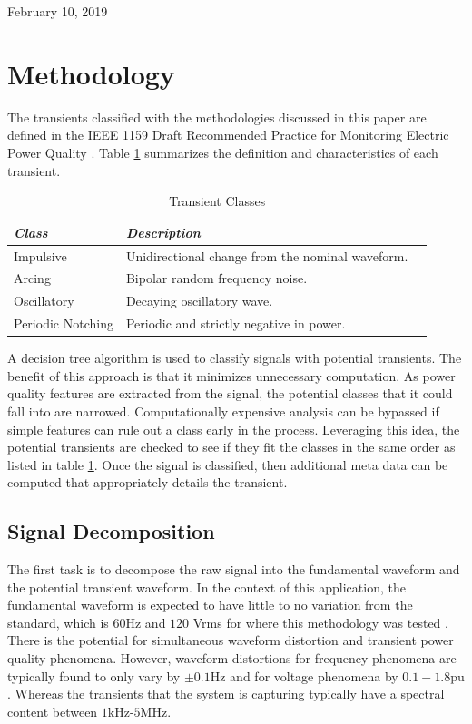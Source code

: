 \documentclass[10pt, conference, compsocconf]{IEEEtran}
\begin{document}
\hfill February 10, 2019

\section{Methodology}
\label{sec:Methodology}
The transients classified with the methodologies discussed in this paper are  defined in the IEEE 1159 Draft Recommended Practice for Monitoring Electric Power Quality \cite{IEEE:2018:1159D3}. Table \ref{TransientClasses} summarizes the definition and characteristics of each transient.

%
\begin{table}[htbp]
\caption{Transient Classes}\label{TransientClasses}
\centering%
\begin{tabular}{lll}
\hline
\textit{Class} & \textit{Description} \\
\hline
Impulsive & Unidirectional change from the nominal waveform. \\
Arcing & Bipolar random frequency noise. \\
Oscillatory & Decaying oscillatory wave. \\
Periodic Notching & Periodic and strictly negative in power. \\
\hline
\end{tabular}
\end{table}
%

A decision tree algorithm is used to classify signals with potential transients. The benefit of this approach is that it minimizes unnecessary computation. As power quality features are extracted from the signal, the potential classes that it could fall into are narrowed. Computationally expensive analysis can be bypassed if simple features can rule out a class early in the process. Leveraging this idea, the potential transients are checked to see if they fit the classes in the same order as listed in table \ref{TransientClasses}. Once the signal is classified, then additional meta data can be computed that appropriately details the transient.

\subsection{Signal Decomposition}

The first task is to decompose the raw signal into the fundamental waveform and the potential transient waveform. In the context of this application, the fundamental waveform is expected to have little to no variation from the standard, which is $60$Hz and $120$ Vrms for where this methodology was tested \cite{ANSI:2016:C84.1-2016}. There is the potential for simultaneous waveform distortion and transient power quality phenomena. However, waveform distortions for frequency phenomena are typically found to only vary by $\pm 0.1$Hz and for voltage phenomena by $0.1-1.8$pu \cite{IEEE:2018:1159D3}. Whereas the transients that the system is capturing typically have a spectral content between $1$kHz-$5$MHz.
\end{document}
